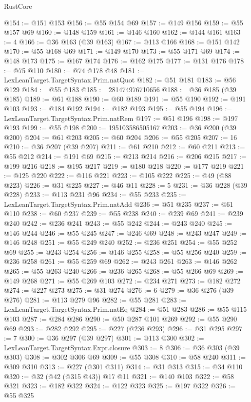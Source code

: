 \begin{lexlean}{RustCore}
\begin{coremodule}
@154 := @151 @153
@156 := @55 @154 @69
@157 := @149 @156
@159 := @55 @157 @69
@160 := @148 @159
@161 := @146 @160
@162 := @144 @161
@163 := 4
@166 := @36 @163 (@39 @163)
@167 := @113 @166
@168 := @151 @142
@170 := @55 @168 @69
@171 := @149 @170
@173 := @55 @171 @69
@174 := @148 @173
@175 := @167 @174
@176 := @162 @175
@177 := @131 @176
@178 := @75 @110
@180 := @74 @178 @48
@181 := LexLeanTarget.TargetSyntax.Prim.natQuot
@182 := @51 @181
@183 := @56 @129
@184 := @55 @183
@185 := 281474976710656
@188 := @36 @185 (@39 @185)
@189 := @61 @188
@190 := @60 @189
@191 := @55 @190
@192 := @191 @103
@193 := @184 @192
@194 := @182 @193
@195 := @55 @194
@196 := LexLeanTarget.TargetSyntax.Prim.natRem
@197 := @51 @196
@198 := @197 @193
@199 := @55 @198
@200 := 195103586505167
@203 := @36 @200 (@39 @200)
@204 := @61 @203
@205 := @60 @204
@206 := @55 @205
@207 := 16
@210 := @36 @207 (@39 @207)
@211 := @61 @210
@212 := @60 @211
@213 := @55 @212
@214 := @191 @69
@215 := @213 @214
@216 := @206 @215
@217 := @199 @216
@218 := @195 @217
@219 := @180 @218
@220 := @177 @219
@221 := @125 @220
@222 := @116 @221
@223 := @105 @222
@225 := @49 (@88 @223)
@226 := @31 @225
@227 := @46 @11
@228 := 5
@231 := @36 @228 (@39 @228)
@233 := @113 @231 @96
@234 := @55 @233
@235 := LexLeanTarget.TargetSyntax.Prim.natAdd
@236 := @51 @235
@237 := @61 @110
@238 := @60 @237
@239 := @55 @238
@240 := @239 @69
@241 := @239 @240
@242 := @236 @241
@243 := @55 @242
@244 := @243 @240
@245 := @146 @244
@246 := @55 @245
@247 := @246 @69
@248 := @243 @247
@249 := @146 @248
@251 := @55 @249 @240
@252 := @236 @251
@254 := @55 @252 @69
@255 := @243 @254
@256 := @146 @255
@258 := @55 @256 @240
@259 := @236 @258
@261 := @55 @259 @69
@262 := @243 @261
@263 := @146 @262
@265 := @55 @263 @240
@266 := @236 @265
@268 := @55 @266 @69
@269 := @149 @268
@271 := @55 @269 @103
@272 := @234 @271
@273 := @182 @272
@274 := @227 @273
@275 := @31 @274
@276 := 6
@279 := @36 @276 (@39 @276)
@281 := @113 @279 @96
@282 := @55 @281
@283 := LexLeanTarget.TargetSyntax.Prim.natEq
@284 := @51 @283
@286 := @55 @115 @103
@287 := @284 @286
@290 := @50 @287 @101 @269
@292 := @55 @290 @69
@293 := @282 @292
@295 := @227 (@236 @293)
@296 := @31 @295
@297 := 7
@300 := @36 @297 (@39 @297)
@301 := @113 @300
@302 := LexLeanTarget.TargetSyntax.Expr.closure
@303 := 8
@306 := @36 @303 (@39 @303)
@308 := @302 @306 @69
@309 := @55 @308
@310 := @58 @240
@311 := @309 @310
@313 := @227 (@301 @311)
@314 := @31 @313
@315 := @34 @110
@320 := @32 (@42 (@315 @43)) @17 @11
@321 := @140 @103
@322 := @58 @321
@323 := @182 @322
@324 := @122 @323
@325 := @197 @322
@326 := @55 @325

\end{coremodule}
\end{lexlean}
